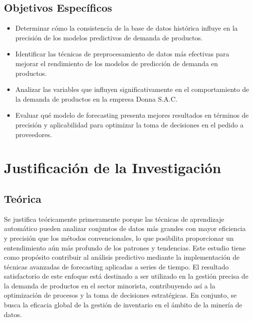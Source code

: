 \subsection{Objetivos Espec\'{i}ficos}
\newcommand{\Objone}{
Determinar cómo la consistencia de la base de datos histórica influye en la precisión de los modelos predictivos de demanda de productos.
}
\newcommand{\Objtwo}{	
Identificar las técnicas de preprocesamiento de datos más efectivas para mejorar el rendimiento de los modelos de predicción de demanda en productos.
}
\newcommand{\Objthree}{
Analizar las variables que influyen significativamente en el comportamiento de la demanda de productos en la empresa Donna S.A.C.
}
\newcommand{\Objfour}{
Evaluar qué modelo de forecasting presenta mejores resultados en términos de precisión y aplicabilidad para optimizar la toma de decisiones en el pedido a proveedores.

}

\begin{itemize}
	\item {\Objone}
	\item {\Objtwo}
	\item {\Objthree}
	\item {\Objfour}
\end{itemize}

\section{Justificación de la Investigación}

\subsection{Teórica}
Se justifica teóricamente primeramente porque las técnicas de aprendizaje automático pueden analizar conjuntos de datos más grandes con mayor eficiencia y precisión que los métodos convencionales, lo que posibilita proporcionar un entendimiento aún más profundo de los patrones y tendencias. Este estudio tiene como propósito contribuir al análisis predictivo mediante la implementación de técnicas avanzadas de forecasting aplicadas a series de tiempo. El resultado satisfactorio de este enfoque está destinado a ser utilizado en la gestión precisa de la demanda de productos en el sector minorista, contribuyendo así a la optimización de procesos y la toma de decisiones estratégicas. En conjunto, se busca la eficacia global de la gestión de inventario en el ámbito de la minería de datos. 

